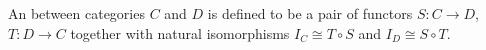 An  between categories $C$ and $D$ is defined to be a pair of functors $S: C \rightarrow D$, $T: D \rightarrow C$ together with natural isomorphisms $I_C \cong T \circ S$ and $I_D \cong S \circ T$.
